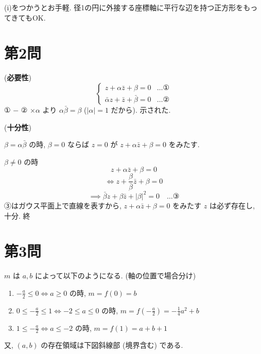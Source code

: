 \documentclass[../main.tex]{subfiles}
\begin{document}
\begin{enumerate}
    \noindent
    [\textbf{別}] (i)をつかうとお手軽. 径1の円に外接する座標軸に平行な辺を持つ正方形をもってきてもOK.
\end{enumerate}

\newpage

\section*{第2問}

\noindent
[\textbf{解}]

\noindent
(\textbf{必要性})
\[
  \begin{cases}
    z + \alpha \bar{z} + \beta = 0 & \dots \text{①} \\
    \bar{\alpha} z + \bar{z} + \bar{\beta} = 0 & \dots \text{②}
  \end{cases}
\]
① $-$ ② $\times \alpha$ より $\alpha \bar{\beta} = \beta$ ($|\alpha| = 1$ だから). 示された.

\vspace{1em}
\noindent
(\textbf{十分性})

$\beta = \alpha \bar{\beta}$ の時, $\beta = 0$ ならば $z = 0$ が $z + \alpha \bar{z} + \beta = 0$ をみたす.

$\beta \neq 0$ の時
\[
  z + \alpha \bar{z} + \beta = 0
\]
\[
  \iff z + \frac{\beta}{\bar{\beta}} \bar{z} + \beta = 0
\]
\[
  \implies \bar{\beta} z + \beta \bar{z} + |\beta|^2 = 0 \quad \dots \text{③}
\]
③はガウス平面上で直線を表すから, $z + \alpha \bar{z} + \beta = 0$ をみたす $z$ は必ず存在し, 十分. \hfill 終

\newpage

\section*{第3問}

\noindent
[\textbf{解}]

\noindent
$m$ は $a, b$ によって以下のようになる. (軸の位置で場合分け)

\begin{enumerate}
  \item[ア] $-\frac{a}{2} \le 0 \iff a \ge 0$ の時, $m = f(0) = b$
  \item[イ] $0 \le -\frac{a}{2} \le 1 \iff -2 \le a \le 0$ の時, $m = f\left(-\frac{a}{2}\right) = -\frac{1}{4}a^2 + b$
  \item[ウ] $1 \le -\frac{a}{2} \iff a \le -2$ の時, $m = f(1) = a + b + 1$
\end{enumerate}

\noindent
又, $(a, b)$ の存在領域は下図斜線部 (境界含む) である.
\end{document}
